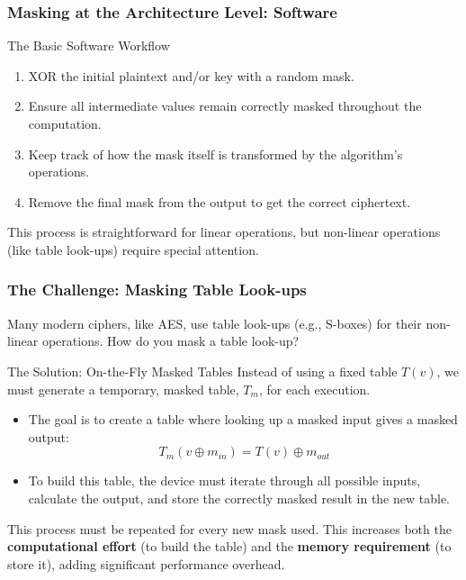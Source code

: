 \begin{frame}
    \frametitle{Masking at the Architecture Level: Software}


    \begin{block}{The Basic Software Workflow}
        \begin{enumerate}
            \item XOR the initial plaintext and/or key with a random mask.
            
            \item Ensure all intermediate values remain correctly masked throughout the computation.
            
            \item Keep track of how the mask itself is transformed by the algorithm's operations.
            
            \item Remove the final mask from the output to get the correct ciphertext.
        \end{enumerate}
    \end{block}

    This process is straightforward for linear operations, but non-linear operations (like table look-ups) require special attention.

\end{frame}

\begin{frame}
    \frametitle{The Challenge: Masking Table Look-ups}

    Many modern ciphers, like AES, use table look-ups (e.g., S-boxes) for their non-linear operations. How do you mask a table look-up?

    \begin{block}{The Solution: On-the-Fly Masked Tables}
        Instead of using a fixed table $T(v)$, we must generate a temporary, masked table, $T_m$, for each execution.
        
        \begin{itemize}
            \item The goal is to create a table where looking up a masked input gives a masked output:
            \[ T_m(v \oplus m_{in}) = T(v) \oplus m_{out} \]
            
            \item To build this table, the device must iterate through all possible inputs, calculate the output, and store the correctly masked result in the new table.
        \end{itemize}
    \end{block}
    
    \begin{alertblock}{}
        This process must be repeated for every new mask used. This increases both the \textbf{computational effort} (to build the table) and the \textbf{memory requirement} (to store it), adding significant performance overhead.
    \end{alertblock}
\end{frame}

